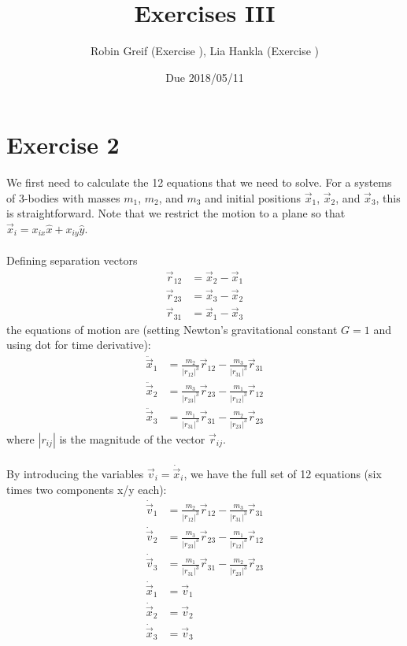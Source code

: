 \documentclass[12pt,a4paper,twoside]{article}
\title{Exercises III}
\author{Robin Greif (Exercise ), Lia Hankla (Exercise )}
\date{Due 2018/05/11}
\begin{document}
\maketitle

\section*{Exercise 2}
We first need to calculate the 12 equations that we need to solve. For a systems of 3-bodies with masses $m_1$, $m_2$, and $m_3$ and initial positions $\vec x_1$, $\vec x_2$, and $\vec x_3$, this is straightforward. Note that we restrict the motion to a plane so that $\vec x_i = x_{ix}\hat x + x_{iy}\hat y$.\\
\\
Defining separation vectors
\begin{align*}
  \vec r_{12} &= \vec x_2 - \vec x_1\\
  \vec r_{23} &= \vec x_3 - \vec x_2\\
  \vec r_{31} &= \vec x_1 - \vec x_3
\end{align*}
the equations of motion are (setting Newton's gravitational constant $G=1$ and using dot for time derivative):
\begin{align*}
  \ddot{\vec x}_1 &= \frac{m_2}{|r_{12}|^3}\vec r_{12}-\frac{m_3}{|r_{31}|^3}\vec r_{31}\\
  \ddot {\vec x}_2 &= \frac{m_3}{|r_{23}|^3}\vec r_{23}-\frac{m_1}{|r_{12}|^3}\vec r_{12}\\
  \ddot {\vec x}_3 &= \frac{m_1}{|r_{31}|^3}\vec r_{31}-\frac{m_2}{|r_{23}|^3}\vec r_{23}
\end{align*}
where $|r_{ij}|$ is the magnitude of the vector $\vec r_{ij}$.\\
\\
By introducing the variables $\vec v_{i} = \dot{\vec x}_i$, we have the full set of 12 equations (six times two components x/y each):
\begin{align*}
  \dot {\vec v}_1 &= \frac{m_2}{|r_{12}|^3}\vec r_{12}-\frac{m_3}{|r_{31}|^3}\vec r_{31}\\
  \dot {\vec v}_2 &= \frac{m_3}{|r_{23}|^3}\vec r_{23}-\frac{m_1}{|r_{12}|^3}\vec r_{12}\\
  \dot {\vec v}_3 &= \frac{m_1}{|r_{31}|^3}\vec r_{31}-\frac{m_2}{|r_{23}|^3}\vec r_{23}\\
  \dot {\vec x}_1 &= \vec v_1\\
  \dot {\vec x}_2 &= \vec v_2\\
  \dot {\vec x}_3 &= \vec v_3
\end{align*}
\end{document}

